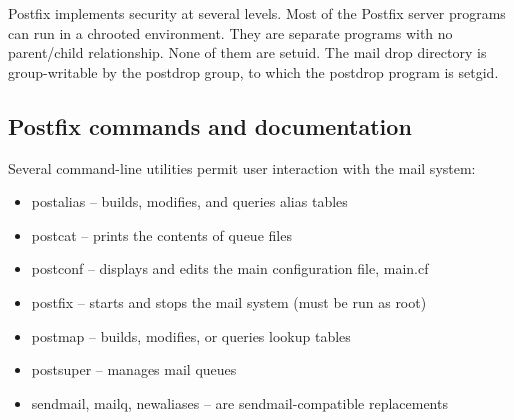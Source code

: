 \protect\hypertarget{part0026_split_059.htmlux5cux23_idIndexMarker2697}{}{}\protect\hypertarget{part0026_split_059.htmlux5cux23_idIndexMarker2698}{}{}Postfix
implements security at several levels. Most of the Postfix server
programs can run in a {chroot}ed environment. They are separate programs
with no {parent/child} relationship. None of them are setuid. The mail
drop directory is group-writable by the postdrop group, to which the
{postdrop}
\protect\hypertarget{part0026_split_059.htmlux5cux23_idIndexMarker2699}{}{}program
is setgid.

\protect\hypertarget{part0026_split_060.html}{}{}

\hypertarget{part0026_split_060.htmlux5cux23_idContainer1247}{}
\hypertarget{part0026_split_060.htmlux5cux23calibre_pb_59}{%
\subsection[Postfix commands and
documentation]{\texorpdfstring{\protect\hypertarget{part0026_split_060.htmlux5cux23_idTextAnchor1171}{}{}Postfix
commands and
documentation}{Postfix commands and documentation}}\label{part0026_split_060.htmlux5cux23calibre_pb_59}}

\protect\hypertarget{part0026_split_060.htmlux5cux23_idIndexMarker2700}{}{}Several
command-line utilities permit user interaction with the mail system:

\begin{itemize}
\item
  \protect\hypertarget{part0026_split_060.htmlux5cux23_idIndexMarker2701}{}{}{postalias}
  -- builds, modifies, and queries alias tables
\item
  \protect\hypertarget{part0026_split_060.htmlux5cux23_idIndexMarker2702}{}{}{postcat}
  -- prints the contents of queue files
\item
  \protect\hypertarget{part0026_split_060.htmlux5cux23_idIndexMarker2703}{}{}{postconf}
  -- displays and edits the main configuration file, {main.cf}
\item
  \protect\hypertarget{part0026_split_060.htmlux5cux23_idIndexMarker2704}{}{}{postfix}
  -- starts and stops the mail system (must be run as root)
\item
  \protect\hypertarget{part0026_split_060.htmlux5cux23_idIndexMarker2705}{}{}{postmap}
  -- builds, modifies, or queries lookup tables
\item
  \protect\hypertarget{part0026_split_060.htmlux5cux23_idIndexMarker2706}{}{}{postsuper}
  -- manages mail queues
\item
  {sendmail}, {mailq}, {newaliases} -- are {sendmail}-compatible
  replacements
\end{itemize}

